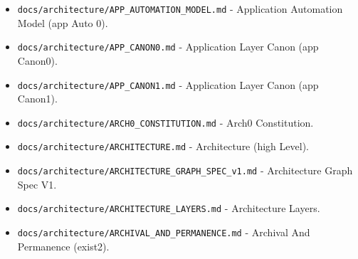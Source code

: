 \documentclass[9pt,a4paper,openany]{book}
\begin{document}
\begin{itemize}
\item \texttt{docs/\allowbreak{}architecture/\allowbreak{}APP\_\allowbreak{}AUTOMATION\_\allowbreak{}MODEL.\allowbreak{}md} -\allowbreak{} Application Automation Model (app Auto 0).\allowbreak{}
\end{itemize}

\begin{itemize}
\item \texttt{docs/\allowbreak{}architecture/\allowbreak{}APP\_\allowbreak{}CANON0.\allowbreak{}md} -\allowbreak{} Application Layer Canon (app Canon0).\allowbreak{}
\end{itemize}

\begin{itemize}
\item \texttt{docs/\allowbreak{}architecture/\allowbreak{}APP\_\allowbreak{}CANON1.\allowbreak{}md} -\allowbreak{} Application Layer Canon (app Canon1).\allowbreak{}
\end{itemize}

\begin{itemize}
\item \texttt{docs/\allowbreak{}architecture/\allowbreak{}ARCH0\_\allowbreak{}CONSTITUTION.\allowbreak{}md} -\allowbreak{} Arch0 Constitution.\allowbreak{}
\end{itemize}

\begin{itemize}
\item \texttt{docs/\allowbreak{}architecture/\allowbreak{}ARCHITECTURE.\allowbreak{}md} -\allowbreak{} Architecture (high Level).\allowbreak{}
\end{itemize}

\begin{itemize}
\item \texttt{docs/\allowbreak{}architecture/\allowbreak{}ARCHITECTURE\_\allowbreak{}GRAPH\_\allowbreak{}SPEC\_\allowbreak{}v1.\allowbreak{}md} -\allowbreak{} Architecture Graph Spec V1.\allowbreak{}
\end{itemize}

\begin{itemize}
\item \texttt{docs/\allowbreak{}architecture/\allowbreak{}ARCHITECTURE\_\allowbreak{}LAYERS.\allowbreak{}md} -\allowbreak{} Architecture Layers.\allowbreak{}
\end{itemize}

\begin{itemize}
\item \texttt{docs/\allowbreak{}architecture/\allowbreak{}ARCHIVAL\_\allowbreak{}AND\_\allowbreak{}PERMANENCE.\allowbreak{}md} -\allowbreak{} Archival And Permanence (exist2).\allowbreak{}
\end{itemize}
\end{document}
